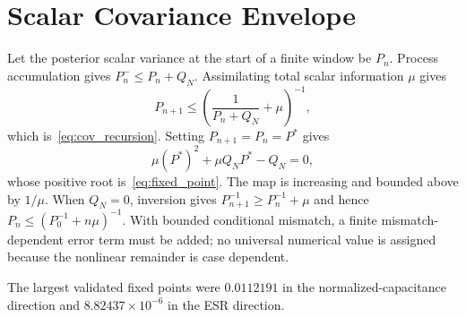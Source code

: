 \section{Scalar Covariance Envelope}
\label{app:covariance}

Let the posterior scalar variance at the start of a finite window be $P_n$. Process accumulation gives $P_n^-\le P_n+Q_N$. Assimilating total scalar information $\mu$ gives
\begin{equation}
P_{n+1}\le\left(\frac{1}{P_n+Q_N}+\mu\right)^{-1},
\end{equation}
which is~\eqref{eq:cov_recursion}. Setting $P_{n+1}=P_n=P^*$ gives
\begin{equation}
\mu(P^*)^2+\mu Q_NP^*-Q_N=0,
\end{equation}
whose positive root is~\eqref{eq:fixed_point}. The map is increasing and bounded above by $1/\mu$. When $Q_N=0$, inversion gives $P_{n+1}^{-1}\ge P_n^{-1}+\mu$ and hence $P_n\le(P_0^{-1}+n\mu)^{-1}$. With bounded conditional mismatch, a finite mismatch-dependent error term must be added; no universal numerical value is assigned because the nonlinear remainder is case dependent.

The largest validated fixed points were $0.0112191$ in the normalized-capacitance direction and $8.82437\times10^{-6}$ in the ESR direction.
